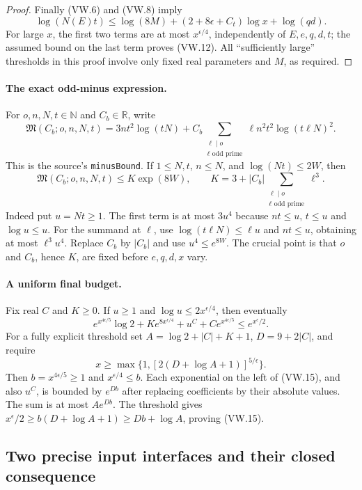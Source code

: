 \begin{proof}
Finally (VW.6) and (VW.8) imply
\[
 \log(N(E)t)\le\log(8M)+(2+8\epsilon+C_t)\log x+\log(qd).
\]
For large $x$, the first two terms are at most $x^{\epsilon/4}$,
independently of $E,e,q,d,t$; the assumed bound on the last term proves
(VW.12).  All ``sufficiently large'' thresholds in this proof involve
only fixed real parameters and $M$, as required.
\end{proof}

\paragraph{The exact odd-minus expression.}
For $o,n,N,t\in\mathbb N$ and $C_b\in\mathbb R$, write
\[
 \mathfrak M(C_b;o,n,N,t)
 =3nt^2\log(tN)+C_b\sum_{\substack{\ell\mid o\\\ell\text{ odd prime}}}
          \ell n^2t^2\log(t\ell N)^2.
 \tag{VW.13}
\]
This is the source's \texttt{minusBound}.  If $1\le N,t$, $n\le N$,
and $\log(Nt)\le2W$, then
\[
 \mathfrak M(C_b;o,n,N,t)\le K\exp(8W),\qquad
 K=3+|C_b|\sum_{\substack{\ell\mid o\\\ell\text{ odd prime}}}\ell^3.
 \tag{VW.14}
\]
Indeed put $u=Nt\ge1$.  The first term is at most $3u^4$ because
$nt\le u$, $t\le u$ and $\log u\le u$.
For the summand at $\ell$, use
$\log(t\ell N)\le\ell u$ and $nt\le u$, obtaining at most
$\ell^3u^4$.  Replace $C_b$ by $|C_b|$ and use $u^4\le e^{8W}$.
The crucial point is that $o$ and $C_b$, hence $K$, are fixed before
$e,q,d,x$ vary.

\paragraph{A uniform final budget.}
Fix real $C$ and $K\ge0$.  If $u\ge1$ and
$\log u\le2x^{\epsilon/4}$, then eventually
\[
 e^{x^{4\epsilon/5}}\log2
       +Ke^{8x^{\epsilon/4}}+u^C+Ce^{x^{4\epsilon/5}}
                     \le e^{x^\epsilon/2}.
 \tag{VW.15}
\]
For a fully explicit threshold set
$A=\log2+|C|+K+1$, $D=9+2|C|$, and require
\[
 x\ge\max\{1,[2(D+\log A+1)]^{5/\epsilon}\}.
\]
Then $b=x^{4\epsilon/5}\ge1$ and $x^{\epsilon/4}\le b$.
Each exponential on the left of (VW.15), and also $u^C$, is bounded
by $e^{Db}$ after replacing coefficients by their absolute values.
The sum is at most $Ae^{Db}$.  The threshold gives
$x^\epsilon/2\ge b(D+\log A+1)\ge Db+\log A$, proving (VW.15).

\subsection{Two precise input interfaces and their closed consequence}

